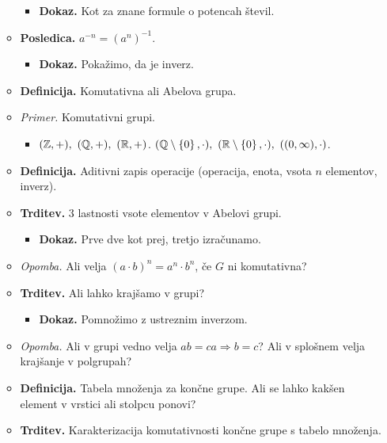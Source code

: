 \begin{enumerate}
\begin{itemize}
\begin{itemize}
            \item \colorbox{green!30}{\textbf{Dokaz.}} Kot za znane formule o potencah števil.
        \end{itemize}
        \item \colorbox{orange!30}{\textbf{Posledica.}} $a^{-n} = (a^{n})^{-1}$.
        \begin{itemize}
            \item \colorbox{green!30}{\textbf{Dokaz.}} Pokažimo, da je inverz.
        \end{itemize}
        \item \colorbox{purple!30}{\textbf{Definicija.}} Komutativna ali Abelova grupa.
        \item \colorbox{yellow!30}{\emph{Primer.}}  Komutativni grupi.
        \begin{itemize}
            \item $(\mathbb{Z}, +), \ (\mathbb{Q}, +),  \ (\mathbb{R}, +)$.
            $(\mathbb{Q} \setminus \left\{0\right\}, \cdot),  \ (\mathbb{R} \setminus \left\{0\right\}, \cdot), \ ((0, \infty), \cdot)$.
        \end{itemize} 
        \item \colorbox{purple!30}{\textbf{Definicija.}} Aditivni zapis operacije (operacija, enota, vsota $n$ elementov, inverz).
        \item \colorbox{blue!30}{\textbf{Trditev.}} 3 lastnosti vsote elementov v Abelovi grupi.
        \begin{itemize}
            \item \colorbox{green!30}{\textbf{Dokaz.}} Prve dve kot prej, tretjo izračunamo.
        \end{itemize}
        \item \colorbox{yellow!30}{\emph{Opomba.}} Ali velja $(a \cdot b)^n = a^n \cdot b^n$, če $G$ ni komutativna?
        \item \colorbox{blue!30}{\textbf{Trditev.}} Ali lahko krajšamo v grupi?
        \begin{itemize}
            \item \colorbox{green!30}{\textbf{Dokaz.}} Pomnožimo z ustreznim inverzom.
        \end{itemize}
        \item \colorbox{yellow!30}{\emph{Opomba.}} Ali v grupi vedno velja $ab = ca \Rightarrow b = c$? Ali v splošnem velja krajšanje v polgrupah?
        \item \colorbox{purple!30}{\textbf{Definicija.}} Tabela množenja za končne grupe. Ali se lahko kakšen element v vrstici ali stolpcu ponovi?
        \item \colorbox{blue!30}{\textbf{Trditev.}} Karakterizacija komutativnosti končne grupe s tabelo množenja. 
    \end{itemize}


\end{enumerate}

